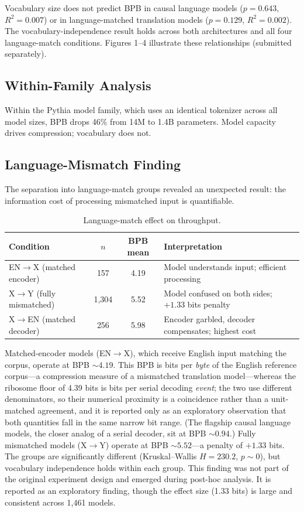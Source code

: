 \documentclass[11pt]{article}
\begin{document}
Vocabulary size does not predict BPB in causal language models ($p = 0.643$, $R^2 = 0.007$) or in language-matched translation models ($p = 0.129$, $R^2 = 0.002$). The vocabulary-independence result holds across both architectures and all four language-match conditions. Figures 1--4 illustrate these relationships (submitted separately).

\subsection{Within-Family Analysis}

Within the Pythia model family, which uses an identical tokenizer across all model sizes, BPB drops 46\% from 14M to 1.4B parameters. Model capacity drives compression; vocabulary does not.

\subsection{Language-Mismatch Finding}

The separation into language-match groups revealed an unexpected result: the information cost of processing mismatched input is quantifiable.

\begin{table}[ht]
\centering
\caption{Language-match effect on throughput.}
\label{tab:lang_mismatch}
\begin{tabular}{lccp{6cm}}
\toprule
Condition & $n$ & BPB mean & Interpretation \\
\midrule
EN$\to$X (matched encoder) & 157 & 4.19 & Model understands input; efficient processing \\
X$\to$Y (fully mismatched) & 1,304 & 5.52 & Model confused on both sides; $+1.33$ bits penalty \\
X$\to$EN (matched decoder) & 256 & 5.98 & Encoder garbled, decoder compensates; highest cost \\
\bottomrule
\end{tabular}
\end{table}

Matched-encoder models (EN$\to$X), which receive English input matching the corpus, operate at BPB $\sim 4.19$. This BPB is bits per \emph{byte} of the English reference corpus---a compression measure of a mismatched translation model---whereas the ribosome floor of 4.39 bits is bits per serial decoding \emph{event}; the two use different denominators, so their numerical proximity is a coincidence rather than a unit-matched agreement, and it is reported only as an exploratory observation that both quantities fall in the same narrow bit range. (The flagship causal language models, the closer analog of a serial decoder, sit at BPB $\sim 0.94$.) Fully mismatched models (X$\to$Y) operate at BPB $\sim 5.52$---a penalty of $+1.33$ bits. The groups are significantly different (Kruskal--Wallis $H = 230.2$, $p \sim 0$), but vocabulary independence holds within each group. This finding was not part of the original experiment design and emerged during post-hoc analysis. It is reported as an exploratory finding, though the effect size (1.33 bits) is large and consistent across 1,461 models.
\end{document}

